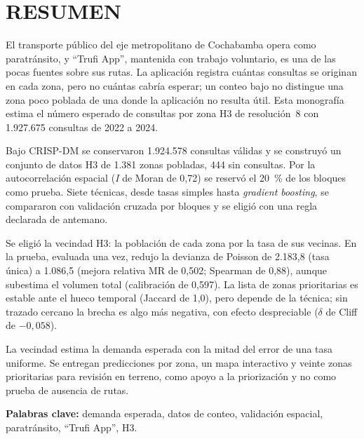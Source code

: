 \chapter*{RESUMEN}
{%
  \garamondfont\fontsize{11.5}{13.8}\selectfont   %
  \setlength{\parskip}{6pt}                       %
  \setlength{\parindent}{0pt}

  El transporte público del eje metropolitano de Cochabamba opera como paratránsito, y ``Trufi App'', mantenida con trabajo voluntario, es una de las pocas fuentes sobre sus rutas. La
  aplicación registra cuántas consultas se originan en cada zona, pero no cuántas cabría
  esperar; un conteo bajo no distingue una zona poco poblada de una donde la aplicación no
  resulta útil. Esta monografía estima el número esperado de consultas por zona H3 de
  resolución~8 con 1.927.675 consultas de 2022 a 2024.

  Bajo CRISP-DM se conservaron 1.924.578 consultas válidas y se construyó un conjunto de datos H3 de 1.381
  zonas pobladas, 444 sin consultas. Por la autocorrelación espacial (\emph{I} de Moran de
  0,72) se reservó el 20~\% de los bloques como prueba. Siete técnicas, desde tasas
  simples hasta \emph{gradient boosting}, se compararon con validación cruzada por bloques y
  se eligió con una regla declarada de antemano.

  Se eligió la vecindad H3: la población de cada zona por la tasa de sus vecinas. En la
  prueba, evaluada una vez, redujo la devianza de Poisson de 2.183,8 (tasa única) a 1.086,5
  (mejora relativa MR de 0,502; Spearman de 0,88), aunque subestima el volumen total (calibración de
  0,597). La lista de zonas prioritarias es estable ante el hueco temporal (Jaccard de 1,0),
  pero depende de la técnica; sin trazado cercano la brecha es algo más negativa, con efecto
  despreciable ($\delta$ de Cliff de $-0{,}058$).

  La vecindad estima la demanda esperada con la mitad del error de una tasa uniforme. Se
  entregan predicciones por zona, un mapa interactivo y veinte zonas prioritarias para
  revisión en terreno, como apoyo a la priorización y no como prueba de ausencia de rutas.

  \noindent\textbf{Palabras clave:} demanda esperada, datos de conteo, validación espacial,
  paratránsito, ``Trufi App'', H3.
}
\clearpage
